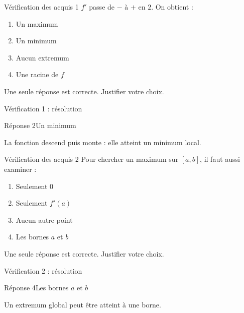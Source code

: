 \documentclass[aspectratio=169,12pt]{beamer}
\begin{document}
\renewcommand{\slidekind}{À VOUS DE JOUER}\begin{frame}[t]{Vérification des acquis 1}
$f\prime$ passe de $-$ à $+$ en $2$. On obtient :\begin{enumerate}
\item Un maximum
\item Un minimum
\item Aucun extremum
\item Une racine de $f$
\end{enumerate}\medskip Une seule réponse est correcte. Justifier votre choix.\end{frame}
\renewcommand{\slidekind}{COMPRENDRE LA RÉPONSE}\begin{frame}[t]{Vérification 1 : résolution}
\begin{block}{Réponse 2}Un minimum\end{block}\medskip La fonction descend puis monte : elle atteint un minimum local.\end{frame}
\renewcommand{\slidekind}{À VOUS DE JOUER}\begin{frame}[t]{Vérification des acquis 2}
Pour chercher un maximum sur $[a,b]$, il faut aussi examiner :\begin{enumerate}
\item Seulement $0$
\item Seulement $f\prime(a)$
\item Aucun autre point
\item Les bornes $a$ et $b$
\end{enumerate}\medskip Une seule réponse est correcte. Justifier votre choix.\end{frame}
\renewcommand{\slidekind}{COMPRENDRE LA RÉPONSE}\begin{frame}[t]{Vérification 2 : résolution}
\begin{block}{Réponse 4}Les bornes $a$ et $b$\end{block}\medskip Un extremum global peut être atteint à une borne.\end{frame}
\end{document}
